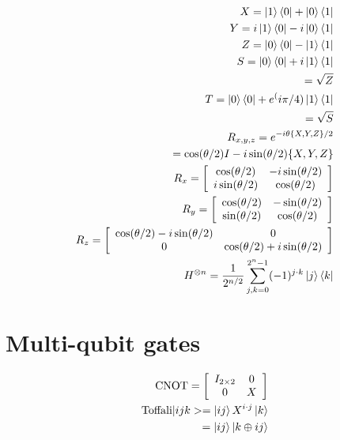\documentclass[twocolumn]{article}
\begin{document}
\begin{eqnarray*}
X = \ket{1}\bra{0} + \ket{0}\bra{1} \\
Y = i\ket{1}\bra{0} -i\ket{0}\bra{1} \\
Z = \ket{0}\bra{0} - \ket{1}\bra{1} \\
S = \ket{0}\bra{0} + i \ket{1}\bra{1} \\
  = \sqrt{Z} \\
T = \ket{0}\bra{0} + e^(i\pi/4) \ket{1}\bra{1} \\
  = \sqrt{S} \\
R_{x,y,z} = e^{-i\theta \{X, Y, Z\}/2} \\
        = \cos(\theta/2)I - i \sin(\theta/2)\{X,Y,Z\} \\
R_x = \left[ \begin{array}{cc}
\cos(\theta/2) & -i\sin(\theta/2) \\
i\sin(\theta/2) & \cos(\theta/2) \\
\end{array} \right] \\
R_y = \left[ \begin{array}{cc}
\cos(\theta/2) & -\sin(\theta/2) \\
\sin(\theta/2) & \cos(\theta/2) \\
\end{array} \right] \\
R_z = \left[ \begin{array}{cc}
\cos(\theta/2)-i\sin(\theta/2) & 0 \\
0 & \cos(\theta/2) + i\sin(\theta/2) \\
\end{array} \right] \\
H^{\otimes n} = \frac{1}{2^{n/2}} \sum_{j,k=0}^{2^n-1} (-1)^{j\cdot k} \ket{j}\bra{k}
\end{eqnarray*}

\section{Multi-qubit gates}

\begin{eqnarray*}
\mbox{CNOT} = \left[ \begin{array}{cc}
I_{2\times 2} & 0 \\
0 & X \\
\end{array} \right] \\
\mbox{Toffali}|ijk> = \ket{ij}X^{i\cdot j}\ket{k} \\
  = \ket{ij}\ket{k\oplus ij} \\
\end{eqnarray*}
\end{document}
